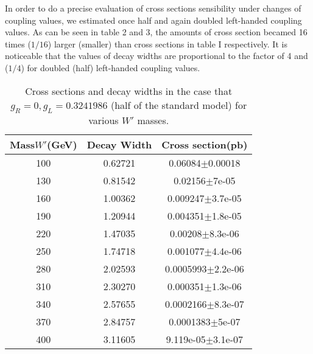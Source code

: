  
 In order to do a precise evaluation of cross sections sensibility under changes of coupling values, we estimated once half and again doubled left-handed coupling values. As can be seen in table 2 and 3, the amounts of cross section becamed 16 times ($ 1/16 $) larger (smaller) than cross sections in table I respectively. It is noticeable that the values of decay widths are proportional to the factor of 4 and ($ 1/4 $) for doubled (half) left-handed coupling values.
  \begin{table}[htb]
	\centering
\begin{tabular}{|c|c|c|}
\hline 
Mass$ W' $(GeV)  &  Decay Width  &  Cross section(pb)\\
\hline 

 100& 0.62721& 0.06084$\pm$0.00018\\
  130& 0.81542& 0.02156$\pm$7e-05\\
  160& 1.00362& 0.009247$\pm$3.7e-05\\
  190& 1.20944& 0.004351$\pm$1.8e-05\\
  220& 1.47035& 0.00208$\pm$8.3e-06\\
  250& 1.74718 &0.001077$\pm$4.4e-06\\
  280& 2.02593& 0.0005993$\pm$2.2e-06\\
  310& 2.30270& 0.000351$\pm$1.3e-06\\
 340& 2.57655& 0.0002166$\pm$8.3e-07\\
 370& 2.84757& 0.0001383$\pm$5e-07\\
  400& 3.11605& 9.119e-05$\pm$3.1e-07\\ 

\hline
\end{tabular}
\caption{Cross sections and decay widths in the case that $ g_R=0 , g_L=0.3241986  $ (half of the standard model) for various $W'$ masses. \label{tab1} }
\end{table}
  
